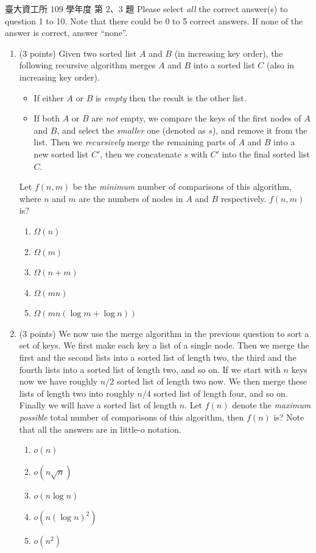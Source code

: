 \begin{pastexam}[label={px:so-3}]{臺大資工所 109 學年度 第 2、3 題}
Please select \textit{all} the correct answer(s) to question 1 to 10. Note that there could be 0 to 5 correct answers. If none of the answer is correct, answer ``none''.
\begin{enumerate}[label=\arabic*., start=2]
\item (3 points) Given two sorted list $A$ and $B$ (in increasing key order), the following recursive algorithm merges $A$ and $B$ into a sorted list $C$ (also in increasing key order).
\begin{itemize}
\item If either $A$ or $B$ is \textit{empty} then the result is the other list.
\item If both $A$ or $B$ are \textit{not} empty, we compare the keys of the first nodes of $A$ and $B$, and select the \textit{smaller} one (denoted as $s$), and remove it from the list. Then we \textit{recursively} merge the remaining parts of $A$ and $B$ into a new sorted list $C'$, then we concatenate $s$ with $C'$ into the final sorted list $C$.
\end{itemize}
Let $f(n,m)$ be the \textit{minimum} number of comparisons of this algorithm, where $n$ and $m$ are the numbers of nodes in $A$ and $B$ respectively. $f(n,m)$ is?
\begin{enumerate}[label=\arabic*.]
\item $\Omega(n)$
\item $\Omega(m)$
\item $\Omega(n+m)$
\item $\Omega(mn)$
\item $\Omega(mn(\log m+\log n))$
\end{enumerate}
\item (3 points) We now use the merge algorithm in the previous question to sort a set of keys. We first make each key a list of a single node. Then we merge the first and the second lists into a sorted list of length two, the third and the fourth lists into a sorted list of length two, and so on. If we start with $n$ keys now we have roughly $n/2$ sorted list of length two now. We then merge these lists of length two into roughly $n/4$ sorted list of length four, and so on. Finally we will have a sorted list of length $n$. Let $f(n)$ denote the \textit{maximum possible} total number of comparisons of this algorithm, then $f(n)$ is? Note that all the answers are in little-o notation.
\begin{enumerate}[label=\arabic*.]
\item $o(n)$
\item $o(n\sqrt{n})$
\item $o(n\log n)$
\item $o(n(\log n)^2)$
\item $o(n^2)$
\end{enumerate}
\end{enumerate}
\end{pastexam}

